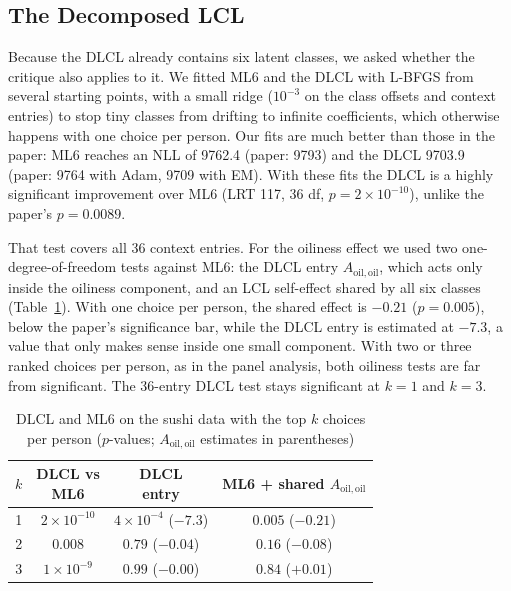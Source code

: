 \documentclass[11pt,journal,a4paper]{IEEEtran}
\newcommand{\Aoo}{A_{\mathrm{oil,oil}}}
\begin{document}
\subsection{The Decomposed LCL}
\label{sec:dlcl}

Because the DLCL already contains six latent classes, we asked whether the critique also applies to it. We fitted
ML6 and the DLCL with L-BFGS from several starting points, with a small ridge ($10^{-3}$ on the class offsets
and context entries) to stop tiny classes from drifting to infinite coefficients, which otherwise happens with
one choice per person. Our fits are much better than those in the paper: ML6 reaches an NLL of 9762.4 (paper:
9793) and the DLCL 9703.9 (paper: 9764 with Adam, 9709 with EM). With these fits the DLCL is a highly significant
improvement over ML6 (LRT 117, 36 df, $p=2\times10^{-10}$), unlike the paper's $p=0.0089$.

That test covers all 36 context entries. For the oiliness effect we used two one-degree-of-freedom tests
against ML6: the DLCL entry $\Aoo$, which acts only inside the oiliness component, and an LCL self-effect shared
by all six classes (Table~\ref{tab:dlclreal}). With one choice per person, the shared effect is $-0.21$
($p=0.005$), below the paper's significance bar, while the DLCL entry is estimated at $-7.3$, a value that only
makes sense inside one small component. With two or three ranked choices per person, as in the panel analysis,
both oiliness tests are far from significant. The 36-entry DLCL test stays significant at $k=1$ and $k=3$.

\begin{table}[!t]
\caption{DLCL and ML6 on the sushi data with the top $k$ choices per person ($p$-values; $\Aoo$ estimates
in parentheses)}
\label{tab:dlclreal}
\centering\footnotesize
\setlength{\tabcolsep}{3pt}
\begin{tabular}{cccc}
\toprule
$k$ & \shortstack{DLCL vs\\ML6} & \shortstack{DLCL\\entry} & \shortstack{ML6 + shared\\$\Aoo$} \\
\midrule
1 & $2\times10^{-10}$ & $4\times10^{-4}$ ($-7.3$) & $0.005$ ($-0.21$) \\
2 & $0.008$ & $0.79$ ($-0.04$) & $0.16$ ($-0.08$) \\
3 & $1\times10^{-9}$ & $0.99$ ($-0.00$) & $0.84$ ($+0.01$) \\
\bottomrule
\end{tabular}
\end{table}
\end{document}
